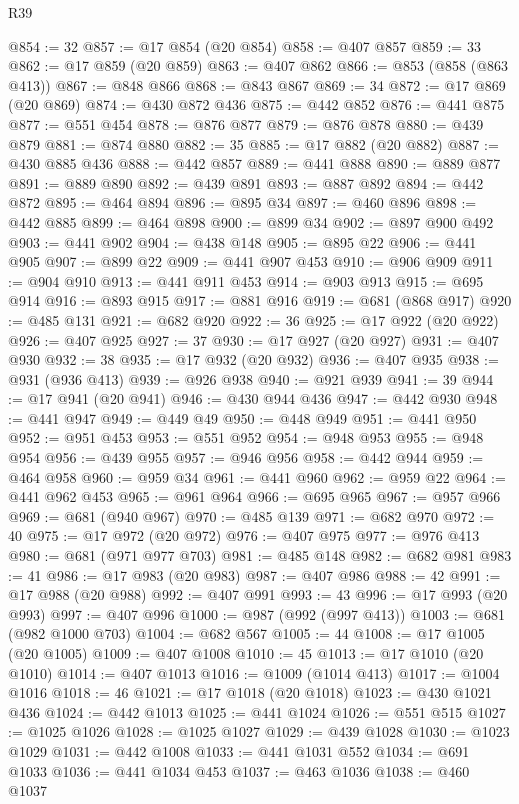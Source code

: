 \begin{lexlean}{R39}
\begin{coremodule}
@854 := 32
@857 := @17 @854 (@20 @854)
@858 := @407 @857
@859 := 33
@862 := @17 @859 (@20 @859)
@863 := @407 @862
@866 := @853 (@858 (@863 @413))
@867 := @848 @866
@868 := @843 @867
@869 := 34
@872 := @17 @869 (@20 @869)
@874 := @430 @872 @436
@875 := @442 @852
@876 := @441 @875
@877 := @551 @454
@878 := @876 @877
@879 := @876 @878
@880 := @439 @879
@881 := @874 @880
@882 := 35
@885 := @17 @882 (@20 @882)
@887 := @430 @885 @436
@888 := @442 @857
@889 := @441 @888
@890 := @889 @877
@891 := @889 @890
@892 := @439 @891
@893 := @887 @892
@894 := @442 @872
@895 := @464 @894
@896 := @895 @34
@897 := @460 @896
@898 := @442 @885
@899 := @464 @898
@900 := @899 @34
@902 := @897 @900 @492
@903 := @441 @902
@904 := @438 @148
@905 := @895 @22
@906 := @441 @905
@907 := @899 @22
@909 := @441 @907 @453
@910 := @906 @909
@911 := @904 @910
@913 := @441 @911 @453
@914 := @903 @913
@915 := @695 @914
@916 := @893 @915
@917 := @881 @916
@919 := @681 (@868 @917)
@920 := @485 @131
@921 := @682 @920
@922 := 36
@925 := @17 @922 (@20 @922)
@926 := @407 @925
@927 := 37
@930 := @17 @927 (@20 @927)
@931 := @407 @930
@932 := 38
@935 := @17 @932 (@20 @932)
@936 := @407 @935
@938 := @931 (@936 @413)
@939 := @926 @938
@940 := @921 @939
@941 := 39
@944 := @17 @941 (@20 @941)
@946 := @430 @944 @436
@947 := @442 @930
@948 := @441 @947
@949 := @449 @49
@950 := @448 @949
@951 := @441 @950
@952 := @951 @453
@953 := @551 @952
@954 := @948 @953
@955 := @948 @954
@956 := @439 @955
@957 := @946 @956
@958 := @442 @944
@959 := @464 @958
@960 := @959 @34
@961 := @441 @960
@962 := @959 @22
@964 := @441 @962 @453
@965 := @961 @964
@966 := @695 @965
@967 := @957 @966
@969 := @681 (@940 @967)
@970 := @485 @139
@971 := @682 @970
@972 := 40
@975 := @17 @972 (@20 @972)
@976 := @407 @975
@977 := @976 @413
@980 := @681 (@971 @977 @703)
@981 := @485 @148
@982 := @682 @981
@983 := 41
@986 := @17 @983 (@20 @983)
@987 := @407 @986
@988 := 42
@991 := @17 @988 (@20 @988)
@992 := @407 @991
@993 := 43
@996 := @17 @993 (@20 @993)
@997 := @407 @996
@1000 := @987 (@992 (@997 @413))
@1003 := @681 (@982 @1000 @703)
@1004 := @682 @567
@1005 := 44
@1008 := @17 @1005 (@20 @1005)
@1009 := @407 @1008
@1010 := 45
@1013 := @17 @1010 (@20 @1010)
@1014 := @407 @1013
@1016 := @1009 (@1014 @413)
@1017 := @1004 @1016
@1018 := 46
@1021 := @17 @1018 (@20 @1018)
@1023 := @430 @1021 @436
@1024 := @442 @1013
@1025 := @441 @1024
@1026 := @551 @515
@1027 := @1025 @1026
@1028 := @1025 @1027
@1029 := @439 @1028
@1030 := @1023 @1029
@1031 := @442 @1008
@1033 := @441 @1031 @552
@1034 := @691 @1033
@1036 := @441 @1034 @453
@1037 := @463 @1036
@1038 := @460 @1037

\end{coremodule}
\end{lexlean}
